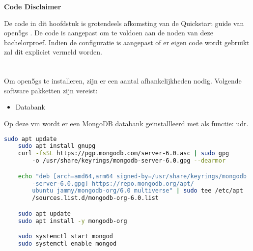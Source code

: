 \begin{center}
    \large\textbf{Code Disclaimer}
\end{center}

\vspace{0.5cm}

\noindent De code in dit hoofdstuk is grotendeels afkomsting van de Quickstart guide van \gls{open5gs} \autocite{Lee2025a}. De code is aangepast om te voldoen aan de noden van deze bachelorproef. Indien de configuratie is aangepast of er eigen code wordt gebruikt zal dit expliciet vermeld worden.
\vspace{0.3cm}

\section{}

Om \gls{open5gs} te installeren, zijn er een aantal afhankelijkheden nodig. Volgende software pakketten zijn vereist:

\begin{itemize}
    \item Databank
\end{itemize}

Op deze \gls{vm} wordt er een MongoDB databank geinstallleerd met als functie: \gls{udr}.





\begin{lstlisting}[language=Bash, caption=Installatie van MongoDB]
    sudo apt update
    sudo apt install gnupg
    curl -fsSL https://pgp.mongodb.com/server-6.0.asc | sudo gpg 
        -o /usr/share/keyrings/mongodb-server-6.0.gpg --dearmor

    echo "deb [arch=amd64,arm64 signed-by=/usr/share/keyrings/mongodb
        -server-6.0.gpg] https://repo.mongodb.org/apt/
        ubuntu jammy/mongodb-org/6.0 multiverse" | sudo tee /etc/apt
        /sources.list.d/mongodb-org-6.0.list

    sudo apt update
    sudo apt install -y mongodb-org

    sudo systemctl start mongod 
    sudo systemctl enable mongod
\end{lstlisting}

